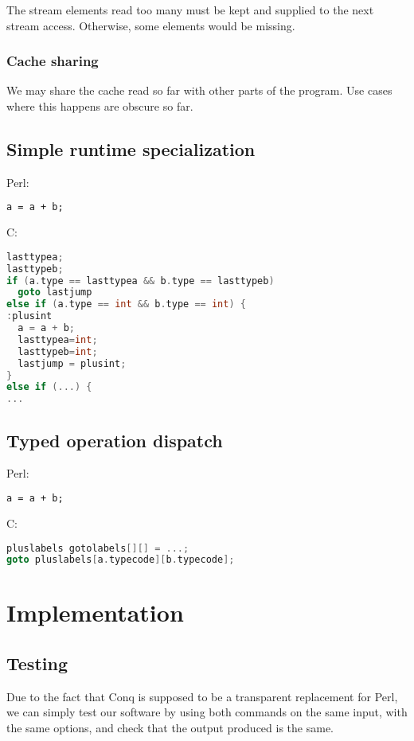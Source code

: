 \documentclass[11pt,a4paper]{report}
\newcommand{\pgl}[1]{\textsf{#1}}
\begin{document}
The stream elements read too many must be kept and supplied to the next stream access. Otherwise, some elements would be missing.

\subsection{Cache sharing}

We may share the cache read so far with other parts of the program. Use cases where this happens are obscure so far.

\section{Simple runtime specialization}


Perl:
\begin{lstlisting}[language=perl]
a = a + b;
\end{lstlisting}

C:
\begin{lstlisting}[language=C]
lasttypea;
lasttypeb;
if (a.type == lasttypea && b.type == lasttypeb)
  goto lastjump
else if (a.type == int && b.type == int) {
:plusint
  a = a + b;
  lasttypea=int;
  lasttypeb=int;
  lastjump = plusint;
}
else if (...) {	
...
\end{lstlisting}

\section{Typed operation dispatch}


Perl:
\begin{lstlisting}[language=perl]
a = a + b;
\end{lstlisting}

C:
\begin{lstlisting}[language=C]
pluslabels gotolabels[][] = ...;
goto pluslabels[a.typecode][b.typecode];
\end{lstlisting}

\chapter{Implementation}

\section{Testing}

Due to the fact that Conq is supposed to be a transparent replacement for \pgl{Perl}, we can simply test our software by using both commands on the same input, with the same options, and check that the output produced is the same.
\end{document}
